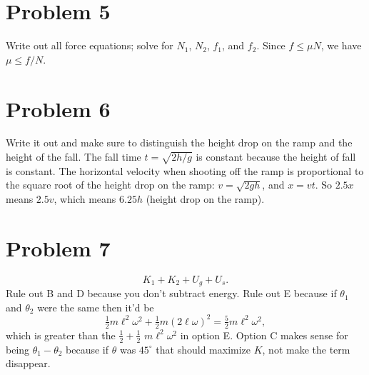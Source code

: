 \documentclass[11pt]{article}
\begin{document}
\begin{center}
\end{center}

\section*{Problem 5}
Write out all force equations; solve for $N_1$, $N_2$, $f_1$, and $f_2$.
Since $f\le \mu N$, we have $\mu \le f/N$.

\section*{Problem 6}
Write it out and make sure to distinguish the height drop on the ramp and the height of the fall.
The fall time $t=\sqrt{2h/g}$ is constant because the height of fall is constant.
The horizontal velocity when shooting off the ramp is proportional to the square root of the height drop on the ramp: $v=\sqrt{2gh}$, and $x=vt$.
So $2.5x$ means $2.5v$, which means $6.25h$ (height drop on the ramp).

\section*{Problem 7}
\[
K_1+K_2+U_g+U_s.
\]
Rule out B and D because you don’t subtract energy.
Rule out E because if $\theta_1$ and $\theta_2$ were the same then it’d be
\[
\tfrac12 m\ell^2\omega^2 + \tfrac12 m(2\ell\omega)^2
=\tfrac52 m\ell^2\omega^2,
\]
which is greater than the $\tfrac12+\tfrac12$ $m\ell^2\omega^2$ in option E.
Option C makes sense for being $\theta_1-\theta_2$ because if $\theta$ was $45^\circ$ that should maximize $K$, not make the term disappear.
\end{document}
